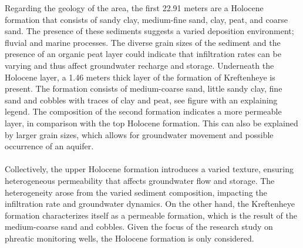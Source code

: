 Regarding the geology of the area, the first 22.91 meters are a Holocene formation that consists of sandy clay, medium-fine sand, clay, peat, and coarse sand. The presence of these sediments suggests a varied deposition environment; fluvial and marine processes. The diverse grain sizes of the sediment and the presence of an organic peat layer could indicate that infiltration rates can be varying and thus affect groundwater recharge and storage. Underneath the Holocene layer, a 1.46 meters thick layer of the formation of Kreftenheye is present. The formation consists of medium-coarse sand, little sandy clay, fine sand and cobbles with traces of clay and peat, see figure  with an explaining legend. The composition of the second formation indicates a more permeable layer, in comparison with the top Holocene formation. This can also be explained by larger grain sizes, which allows for groundwater movement and possible occurrence of an aquifer. \\
\\
Collectively, the upper Holocene formation introduces a varied texture, ensuring heterogeneous permeability that affects groundwater flow and storage. The heterogeneity arose from the varied sediment composition, impacting the infiltration rate and groundwater dynamics. On the other hand, the Kreftenheye formation characterizes itself as a permeable formation, which is the result of the medium-coarse sand and cobbles. Given the focus of the research study on phreatic monitoring wells, the Holocene formation is only considered.
\newpage
